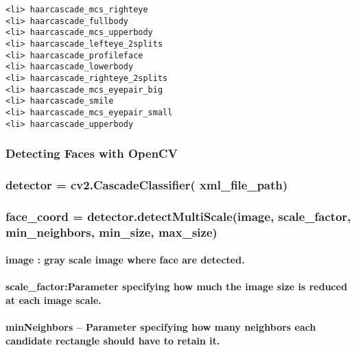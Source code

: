 \documentclass[11pt]{article}
\begin{document}
\begin{verbatim}
<li> haarcascade_mcs_righteye
<li> haarcascade_fullbody            
<li> haarcascade_mcs_upperbody
<li> haarcascade_lefteye_2splits    
<li> haarcascade_profileface
<li> haarcascade_lowerbody            
<li> haarcascade_righteye_2splits
<li> haarcascade_mcs_eyepair_big     
<li> haarcascade_smile
<li> haarcascade_mcs_eyepair_small
<li> haarcascade_upperbody
\end{verbatim}

    \subsubsection{Detecting Faces with
OpenCV}\label{detecting-faces-with-opencv}

    \subsubsection{detector = cv2.CascadeClassifier(
xml\_file\_path)}\label{detector-cv2.cascadeclassifier-xml_file_path}

\subsubsection{face\_coord = detector.detectMultiScale(image,
scale\_factor, min\_neighbors, min\_size,
max\_size)}\label{face_coord-detector.detectmultiscaleimage-scale_factor-min_neighbors-min_size-max_size}

    \paragraph{image : gray scale image where face are
detected.}\label{image-gray-scale-image-where-face-are-detected.}

\paragraph{scale\_factor:Parameter specifying how much the image size is
reduced at each image
scale.}\label{scale_factorparameter-specifying-how-much-the-image-size-is-reduced-at-each-image-scale.}

\paragraph{minNeighbors -- Parameter specifying how many neighbors each
candidate rectangle should have to retain
it.}\label{minneighbors-parameter-specifying-how-many-neighbors-each-candidate-rectangle-should-have-to-retain-it.}
\end{document}
